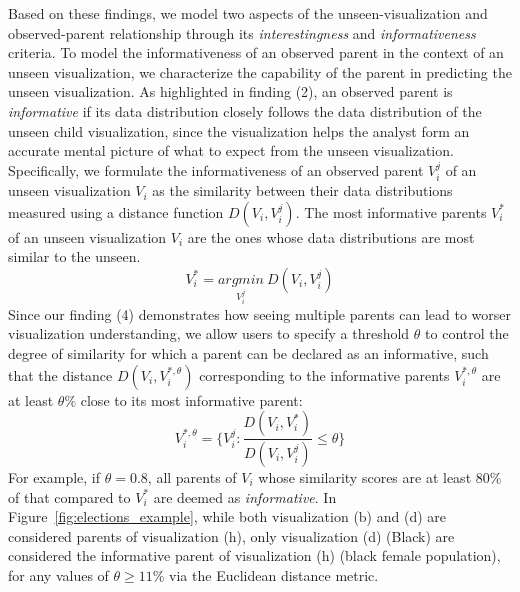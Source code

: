 \npar Based on these findings, we model two aspects of the unseen-visualization and observed-parent relationship through its \textit{interestingness} and \textit{informativeness} criteria.
 To model the informativeness of an observed parent in the context of an unseen visualization, we characterize the capability of the parent in predicting the unseen visualization. As highlighted in finding (2), an observed parent is \emph{informative} if its data distribution closely follows the data distribution of the unseen child visualization, since the visualization helps the analyst form an accurate mental picture of what to expect from the unseen visualization. Specifically, we formulate the informativeness of an observed parent $V_i^j$ of an unseen visualization $V_i$ as the similarity between their data distributions measured using a distance function $D(V_i, V_i^j)$. The most informative parents $V_i^*$ of an unseen visualization $V_i$ are the ones whose data distributions are most similar to the unseen.
\begin{equation}
    V_i^*=\underset{V_i^j}{argmin}\ D(V_i, V_i^j)
\end{equation}
Since our finding (4) demonstrates how seeing multiple parents can lead to worser visualization understanding, we allow users to specify a threshold $\theta$ to control the degree of similarity for which a parent can be declared as an informative, such that the distance $D(V_i, V_i^{*, \theta})$ corresponding to the informative parents $V_i^{*, \theta}$ are at least $\theta\%$ close to its most informative parent:
\begin{equation}
    V_i^{*, \theta} = \{V_i^j : \frac{D(V_i, V_i^*)}{D(V_i, V_i^j)} \leq \theta\}
\end{equation}
For example, if $\theta = 0.8$, all parents of $V_i$ whose similarity scores are at least 80\% of that compared to $V_i^*$ are deemed as \textit{informative}. In Figure~\ref{fig:elections_example}, while both visualization (b) and (d) are considered parents of visualization (h), only visualization (d) (Black) are considered the informative parent of visualization (h) (black female population), for any values of $\theta \geq 11\%$ via the Euclidean distance metric. %

